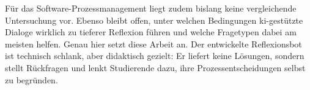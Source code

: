Für das Software-Prozessmanagement liegt zudem bislang keine vergleichende Untersuchung vor. Ebenso
bleibt offen, unter welchen Bedingungen \acrshort{ki}-gestützte Dialoge wirklich zu tieferer
Reflexion führen und welche Fragetypen dabei am meisten helfen.
Genau hier setzt diese Arbeit an.
Der entwickelte Reflexionsbot ist technisch schlank, aber didaktisch gezielt: Er liefert keine
Lösungen, sondern stellt Rückfragen und lenkt Studierende dazu, ihre Prozessentscheidungen
selbst zu begründen.

